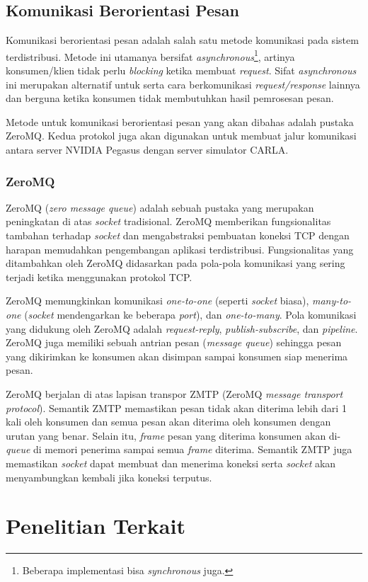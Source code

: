 \subsection{Komunikasi Berorientasi Pesan}

Komunikasi berorientasi pesan adalah salah satu metode komunikasi pada sistem
terdistribusi. Metode ini utamanya bersifat
\textit{asynchronous}\footnote{Beberapa implementasi bisa \textit{synchronous}
    juga.}, artinya konsumen/klien tidak perlu \textit{blocking} ketika membuat
\textit{request}. Sifat \textit{asynchronous} ini merupakan alternatif untuk
serta cara berkomunikasi \textit{request/response} lainnya dan berguna ketika
konsumen tidak membutuhkan hasil pemrosesan pesan.

Metode untuk komunikasi berorientasi pesan yang akan dibahas adalah pustaka
ZeroMQ. Kedua protokol juga akan digunakan untuk membuat jalur komunikasi antara
server NVIDIA Pegasus dengan server simulator CARLA.

\subsubsection{ZeroMQ}

ZeroMQ (\textit{zero message queue}) adalah sebuah pustaka yang merupakan
pe\-ning\-ka\-tan di atas \textit{socket} tradisional. ZeroMQ memberikan
fungsionalitas tambahan terhadap \textit{socket} dan mengabstraksi pembuatan
koneksi TCP dengan harapan memudahkan pengembangan aplikasi terdistribusi.
Fungsionalitas yang ditambahkan oleh ZeroMQ didasarkan pada pola-pola komunikasi
yang sering terjadi ketika menggunakan protokol TCP.

ZeroMQ memungkinkan komunikasi \textit{one-to-one} (seperti \textit{socket}
biasa), \textit{many-to-one} (\textit{socket} mendengarkan ke beberapa
\textit{port}), dan \textit{one-to-many}. Pola komunikasi yang didukung oleh
ZeroMQ adalah \textit{request-reply}, \textit{publish-subscribe}, dan
\textit{pipeline}. ZeroMQ juga memiliki sebuah antrian pesan (\textit{message
    queue}) sehingga pesan yang dikirimkan ke konsumen akan disimpan
sampai konsumen siap menerima pesan.

ZeroMQ berjalan di atas lapisan transpor ZMTP (ZeroMQ \textit{message transport
    protocol}). Semantik ZMTP memastikan pesan tidak akan diterima lebih dari 1 kali
oleh konsumen dan semua pesan akan diterima oleh konsumen dengan urutan yang
benar. Selain itu, \textit{frame} pesan yang diterima konsumen akan
di-\textit{queue} di memori penerima sampai semua \textit{frame} diterima.
Semantik ZMTP juga memastikan \textit{socket} dapat membuat dan menerima koneksi
serta \textit{socket} akan menyambungkan kembali jika koneksi terputus.

\section{Penelitian Terkait}
\blindtext